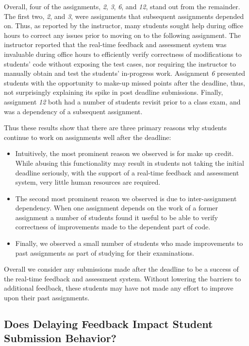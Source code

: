 Overall, four of the assignments, \emph{2}, \emph{3}, \emph{6}, and \emph{12},
stand out from the remainder. The first two, \emph{2}, and \emph{3}, were
assignments that subsequent assignments depended on. Thus, as reported by the
instructor, many students sought help during office hours to correct any issues
prior to moving on to the following assignment. The instructor reported that
the real-time feedback and assessment system was invaluable during office hours
to efficiently verify correctness of modifications to students' code without
exposing the test cases, nor requiring the instructor to manually obtain and
test the students' in-progress work. Assignment \emph{6} presented students
with the opportunity to make-up missed points after the deadline, thus, not
surprisingly explaining its spike in post deadline submissions. Finally,
assignment \emph{12} both had a number of students revisit prior to a class
exam, and was a dependency of a subsequent assignment.

Thus these results show that there are three primary reasons why students
continue to work on assignments well after the deadline:

\begin{itemize}
\item Intuitively, the most prominent reason we observed is for make up
  credit. While abusing this functionality may result in students not taking
  the initial deadline seriously, with the support of a real-time feedback and
  assessment system, very little human resources are required.
\item The second most prominent reason we observed is due to inter-assignment
  dependency. When one assignment depends on the work of a former assignment a
  number of students found it useful to be able to verify correctness of
  improvements made to the dependent part of code.
\item Finally, we observed a small number of students who made improvements to
  past assignments as part of studying for their examinations.
\end{itemize}

Overall we consider any submissions made after the deadline to be a success of
the real-time feedback and assessment system. Without lowering the barriers to
additional feedback, these students may have not made any effort to improve
upon their past assignments.

\subsection{Does Delaying Feedback Impact Student Submission Behavior?}

